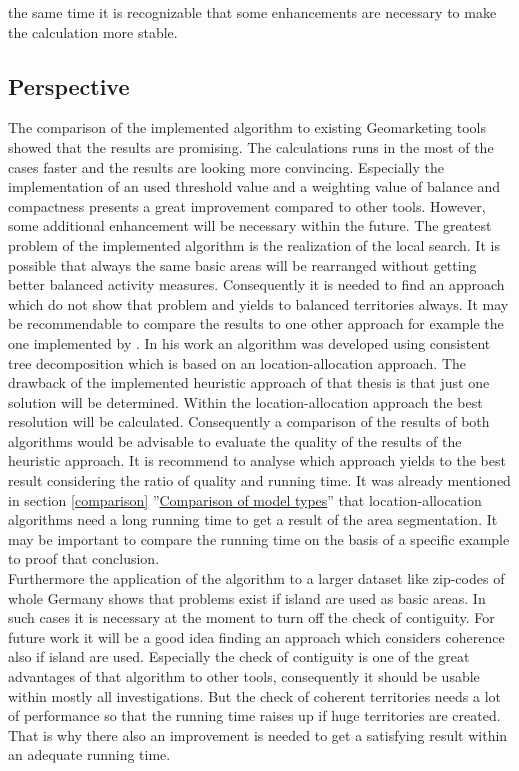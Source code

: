 the same time it is recognizable that some enhancements are necessary to make the calculation more stable.

\subsection{Perspective}
The comparison of the implemented algorithm to existing Geomarketing tools showed that the results are promising. The calculations runs in the most of the cases faster and the results are looking more convincing. Especially the implementation of an used threshold value and a weighting value of balance and compactness presents a great improvement compared to other tools. However, some additional enhancement will be necessary within the future. The greatest problem of the implemented algorithm is the realization of the local search. It is possible that always the same basic areas will be rearranged without getting better balanced activity measures. Consequently it is needed to find an approach which do not show that problem and yields to balanced territories always. It may be recommendable to compare the results to one other approach for example the one implemented by \citeauthor{kalcsics} \cite{kalcsics}. In his work an algorithm was developed using consistent tree decomposition which is based on an location-allocation approach. The drawback of the implemented heuristic approach of that thesis is that just one solution will be determined. Within the location-allocation approach the best resolution will be calculated. Consequently a comparison of the results of both algorithms would be advisable to evaluate the quality of the results of the heuristic approach. It is recommend to analyse which approach yields to the best result considering the ratio of quality and running time. It was already mentioned in section \ref{comparison} ''\hyperref[comparison]{Comparison of model types}'' that location-allocation algorithms need a long running time to get a result of the area segmentation. It may be important to compare the running time on the basis of a specific example to proof that conclusion. \\
Furthermore the application of the algorithm to a larger dataset like zip-codes of whole Germany shows that problems exist if island are used as basic areas. In such cases it is necessary at the moment to turn off the check of contiguity. For future work it will be a good idea finding an approach which considers coherence also if island are used. Especially the check of contiguity is one of the great advantages of that algorithm to other tools, consequently it should be usable within mostly all investigations. But the check of coherent territories needs a lot of performance so that the running time raises up if huge territories are created. That is why there also an improvement is needed to get a satisfying result within an adequate running time.\\
